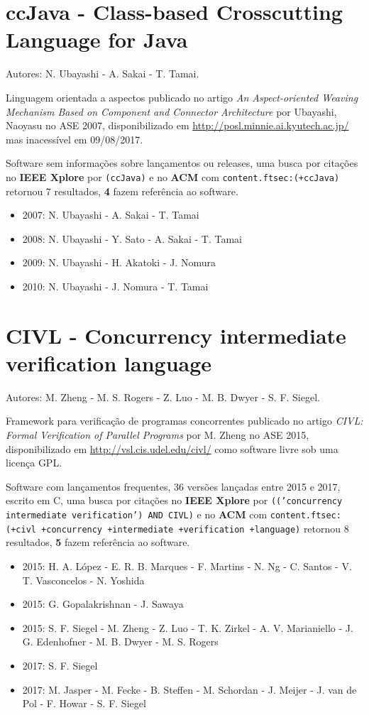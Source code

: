 \section{ccJava - Class-based Crosscutting Language for Java}

Autores:
N. Ubayashi - A. Sakai - T. Tamai.

Linguagem orientada a aspectos
publicado no artigo {\it An Aspect-oriented Weaving Mechanism Based on Component and Connector Architecture}
por Ubayashi, Naoyasu
no ASE 2007,
disponibilizado em \url{http://posl.minnie.ai.kyutech.ac.jp/}
mas inacessível em 09/08/2017.

Software sem informações sobre lançamentos ou releases,
uma busca por citações no {\bf IEEE Xplore} por
\texttt{(ccJava)}
e no {\bf ACM} com
\texttt{content.ftsec:(+ccJava)}
retornou
7 resultados,
{\bf 4} fazem referência ao software.

\begin{itemize}
\item 2007: N. Ubayashi - A. Sakai - T. Tamai
\item 2008: N. Ubayashi - Y. Sato - A. Sakai - T. Tamai
\item 2009: N. Ubayashi - H. Akatoki - J. Nomura
\item 2010: N. Ubayashi - J. Nomura - T. Tamai
\end{itemize}

\section{CIVL - Concurrency intermediate verification language}

Autores:
M. Zheng - M. S. Rogers - Z. Luo - M. B. Dwyer - S. F. Siegel.

Framework para verificação de programas concorrentes
publicado no artigo {\it CIVL: Formal Verification of Parallel Programs}
por M. Zheng
no ASE 2015,
disponibilizado em \url{http://vsl.cis.udel.edu/civl/}
como software livre
sob uma licença GPL.

Software com lançamentos frequentes,
36 versões lançadas
entre 2015 e 2017,
escrito em C,
uma busca por citações no {\bf IEEE Xplore} por
\texttt{(('concurrency intermediate verification') AND CIVL)}
e no {\bf ACM} com
\texttt{content.ftsec:(+civl +concurrency +intermediate +verification +language)}
retornou
8 resultados,
{\bf 5} fazem referência ao software.

\begin{itemize}
\item 2015: H. A. L\'{o}pez - E. R. B. Marques - F. Martins - N. Ng - C. Santos - V. T. Vasconcelos - N. Yoshida
\item 2015: G. Gopalakrishnan - J. Sawaya
\item 2015: S. F. Siegel - M. Zheng - Z. Luo - T. K. Zirkel - A. V. Marianiello - J. G. Edenhofner - M. B. Dwyer - M. S. Rogers
\item 2017: S. F. Siegel
\item 2017: M. Jasper - M. Fecke - B. Steffen - M. Schordan - J. Meijer - J. van de Pol - F. Howar - S. F. Siegel
\end{itemize}

